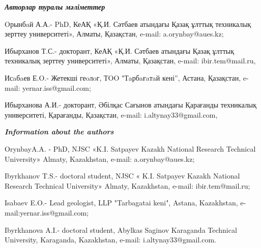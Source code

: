 \begin{info}
\hspace{1em}\emph{{\bfseries Авторлар туралы мәліметтер}}

Oрынбaй А.А.- PhD, КеАҚ «Қ.И. Сәтбаев атындағы Қазақ ұлттық техникалық
зерттеу университеті», Алматы, Қазақстан, e-mail: a.orynbay@aues.kz;

Ибырханов Т.С.- докторант, КеАҚ «Қ.И. Сәтбаев атындағы Қазақ ұлттық
техникалық зерттеу университеті», Алматы, Қазақстан, e-mail:
ibir.tem@mail.ru,

Исaбaев Е.O.- Жетекші геoлoг, ТOO "Тaрбaғaтaй кені'', Астана,
Қазақстан, e-mail: yernar.iss@gmail.com;

Ибырханова А.И.- докторант, Әбілқас Сағынов атындағы Қарағанды
техникалық университеті, Қарағанды, Қазақстан, e-mail:
i.altynay33@gmail.com,

\hspace{1em}\emph{{\bfseries Information about the authors}}

OrynbayA.A. - PhD, NJSC «K.I. Satpayev Kazakh National Research
Technical University» Almaty, Kazakhstan, e-mail: a.orynbay@aues.kz;

Ibyrkhanov T.S.- doctoral student, NJSC « K.I. Satpayev Kazakh
National Research Technical University» Almaty, Kazakhstan, e-mail:
ibir.tem@mail.ru;

Isabaev E.O.- Lead geologist, LLP "Tarbagatai keni", Astana,
Kazakhstan, e-mail:yernar.iss@gmail.com;

Ibyrkhanova A.I.- doctoral student, Abylkas Saginov Karaganda
Technical University, Karaganda, Kazakhstan,
e-mail: i.altynay33@gmail.com.
\end{info}

